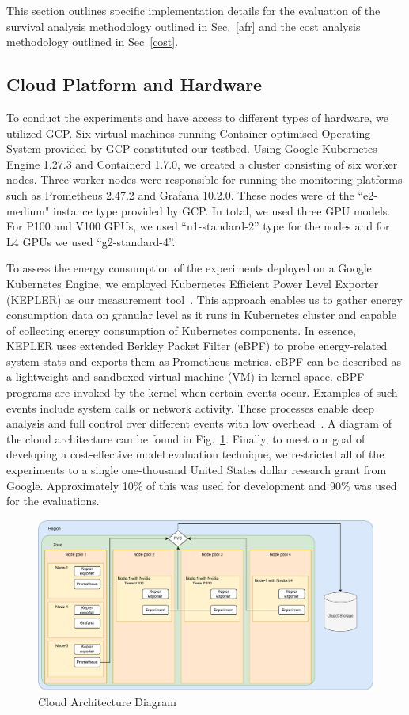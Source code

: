 \documentclass[conference]{IEEEtran}
\begin{document}
This section outlines specific implementation details for the evaluation of the survival analysis methodology outlined in Sec.~\ref{afr} and the cost analysis methodology outlined in Sec~\ref{cost}.


\subsection{Cloud Platform and Hardware}
To conduct the experiments and have access to different types of hardware, we utilized GCP. Six virtual machines running Container optimised Operating System provided by GCP constituted our testbed. Using Google Kubernetes Engine 1.27.3 and Containerd 1.7.0,  we created a cluster consisting of six worker nodes. Three worker nodes were responsible for running the monitoring platforms such as Prometheus 2.47.2 and Grafana 10.2.0. These nodes were of the ``e2-medium" instance type provided by GCP. In total, we used three GPU models. For P100 and V100 GPUs, we used ``n1-standard-2'' type for the nodes and for L4 GPUs we used ``g2-standard-4''.

To assess the energy consumption of the experiments deployed on a Google Kubernetes Engine, we employed Kubernetes Efficient Power Level Exporter (KEPLER) as our measurement tool~\cite{amaral2023kepler}. This approach enables us to gather energy consumption data on granular level as it runs in Kubernetes cluster and capable of collecting energy consumption of Kubernetes components. In essence, KEPLER uses extended Berkley Packet Filter (eBPF) to probe energy-related system stats and exports them as Prometheus metrics. eBPF can be described as a lightweight and sandboxed virtual machine (VM) in kernel space. eBPF programs are invoked by the kernel when certain events occur. Examples of such events include system calls or network activity. These processes enable deep analysis and full control over different events with low overhead~\cite{sedghpour@ebpf}. A diagram of the cloud architecture can be found in Fig.~\ref{fig:architecture}. Finally, to meet our goal of developing a cost-effective model evaluation technique, we restricted all of the experiments to a single one-thousand United States dollar research grant from Google. Approximately 10\% of this was used for development and 90\% was used for the evaluations.

\begin{figure}
    \centering
    \includegraphics[width=.8\textwidth]{plots/architecture.pdf}
    \caption{Cloud Architecture Diagram}
    \label{fig:architecture}
\end{figure}
\end{document}
